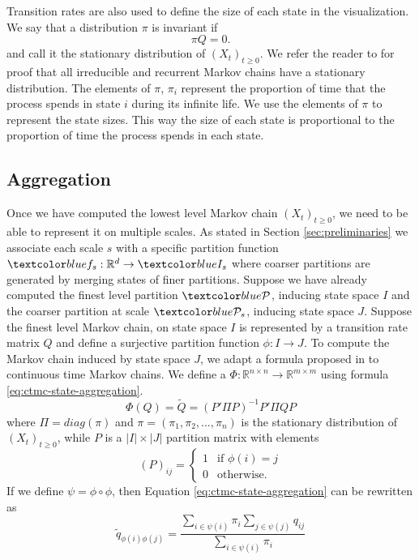Transition rates are also used to define the size of each state in the visualization. We say that a distribution
$\pi$ is invariant if
\begin{equation}
	\nonumber
	\pi Q = 0.
\end{equation}
and call it the stationary distribution of $(X_t)_{t \ge 0}$. We refer the reader to \cite{norris1998markov}
for proof that all irreducible and recurrent Markov chains have a stationary distribution. The elements
of $\pi$, $\pi_i$ represent the proportion of time that the process spends in state $i$ during its infinite
life. We use the elements of $\pi$ to represent the state sizes. This way the size of each state is proportional
to the proportion of time the process spends in each state.


\subsection{Aggregation}

Once we have computed the lowest level Markov chain $(X_t)_{t \ge 0}$, we need to be able to represent it on multiple scales.
As stated in Section \ref{sec:preliminaries} we associate each scale $s$ with a specific partition function
$\lstopar{f_s}: \mathbb{R}^d \rightarrow \lstopar{I_s}$ where coarser partitions are generated by merging 
states of finer partitions.
Suppose we have already computed the finest level partition $\lstopar{\cP}$, inducing state space $I$ and the
coarser partition at scale $\lstopar{\cP_s}$, inducing state space $J$. Suppose the finest level Markov chain,
on state space $I$ is represented by a transition rate matrix $Q$ and define a surjective partition function
$\phi: I \rightarrow J$. To compute the Markov chain induced by state space $J$, we adapt a formula proposed
in \cite{5746509} to continuous time Markov chains. We define a 
$\Phi: \mathbb{R}^{n \times n} \rightarrow \mathbb{R}^{m \times m}$ using formula \ref{eq:ctmc-state-aggregation}.
\begin{equation}
	\label{eq:ctmc-state-aggregation}
	\Phi(Q) = \tilde{Q} = (P' \Pi P)^{-1} P' \Pi Q P
\end{equation}
where $\Pi = diag(\pi)$ and $\pi = (\pi_1, \pi_2, ..., \pi_n)$ is the stationary distribution of $(X_t)_{t \ge 0}$, while $P$ is a 
$|I| \times |J|$ partition matrix with elements
\begin{equation}
	\nonumber
	\left(P\right)_{ij} = 
		\left\{
			\begin{array}{ll}
				1 & \mbox{if } \phi(i) = j \\
				0 & \mbox{otherwise}.
			\end{array}
		\right.
\end{equation}
If we define $\psi = \phi \circ \phi$, then Equation \ref{eq:ctmc-state-aggregation} can be rewritten as
\begin{equation}
	\nonumber
	\tilde{q}_{\phi(i)\phi(j)} = \frac{\sum\limits_{i \in \psi(i)}\pi_i \sum\limits_{j \in \psi(j)} q_{ij}}{\sum\limits_{i \in \psi(i)}\pi_i}
\end{equation}